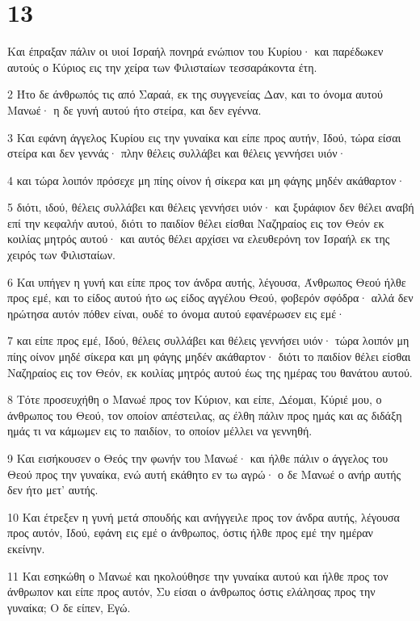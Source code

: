 \chapter{13}

\par Και έπραξαν πάλιν οι υιοί Ισραήλ πονηρά ενώπιον του Κυρίου· και παρέδωκεν αυτούς ο Κύριος εις την χείρα των Φιλισταίων τεσσαράκοντα έτη.
\par 2 Ήτο δε άνθρωπός τις από Σαραά, εκ της συγγενείας Δαν, και το όνομα αυτού Μανωέ· η δε γυνή αυτού ήτο στείρα, και δεν εγέννα.
\par 3 Και εφάνη άγγελος Κυρίου εις την γυναίκα και είπε προς αυτήν, Ιδού, τώρα είσαι στείρα και δεν γεννάς· πλην θέλεις συλλάβει και θέλεις γεννήσει υιόν·
\par 4 και τώρα λοιπόν πρόσεχε μη πίης οίνον ή σίκερα και μη φάγης μηδέν ακάθαρτον·
\par 5 διότι, ιδού, θέλεις συλλάβει και θέλεις γεννήσει υιόν· και ξυράφιον δεν θέλει αναβή επί την κεφαλήν αυτού, διότι το παιδίον θέλει είσθαι Ναζηραίος εις τον Θεόν εκ κοιλίας μητρός αυτού· και αυτός θέλει αρχίσει να ελευθερόνη τον Ισραήλ εκ της χειρός των Φιλισταίων.
\par 6 Και υπήγεν η γυνή και είπε προς τον άνδρα αυτής, λέγουσα, Άνθρωπος Θεού ήλθε προς εμέ, και το είδος αυτού ήτο ως είδος αγγέλου Θεού, φοβερόν σφόδρα· αλλά δεν ηρώτησα αυτόν πόθεν είναι, ουδέ το όνομα αυτού εφανέρωσεν εις εμέ·
\par 7 και είπε προς εμέ, Ιδού, θέλεις συλλάβει και θέλεις γεννήσει υιόν· τώρα λοιπόν μη πίης οίνον μηδέ σίκερα και μη φάγης μηδέν ακάθαρτον· διότι το παιδίον θέλει είσθαι Ναζηραίος εις τον Θεόν, εκ κοιλίας μητρός αυτού έως της ημέρας του θανάτου αυτού.
\par 8 Τότε προσευχήθη ο Μανωέ προς τον Κύριον, και είπε, Δέομαι, Κύριέ μου, ο άνθρωπος του Θεού, τον οποίον απέστειλας, ας έλθη πάλιν προς ημάς και ας διδάξη ημάς τι να κάμωμεν εις το παιδίον, το οποίον μέλλει να γεννηθή.
\par 9 Και εισήκουσεν ο Θεός την φωνήν του Μανωέ· και ήλθε πάλιν ο άγγελος του Θεού προς την γυναίκα, ενώ αυτή εκάθητο εν τω αγρώ· ο δε Μανωέ ο ανήρ αυτής δεν ήτο μετ' αυτής.
\par 10 Και έτρεξεν η γυνή μετά σπουδής και ανήγγειλε προς τον άνδρα αυτής, λέγουσα προς αυτόν, Ιδού, εφάνη εις εμέ ο άνθρωπος, όστις ήλθε προς εμέ την ημέραν εκείνην.
\par 11 Και εσηκώθη ο Μανωέ και ηκολούθησε την γυναίκα αυτού και ήλθε προς τον άνθρωπον και είπε προς αυτόν, Συ είσαι ο άνθρωπος όστις ελάλησας προς την γυναίκα; Ο δε είπεν, Εγώ.
